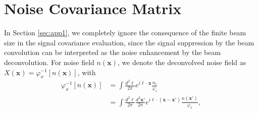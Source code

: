 \documentclass[aps, prd, reprint, nofootinbib, groupedaddress, showpacs]{revtex4-1}
\def\be{\begin{equation}}
\def\ee{\end{equation}}
\newcommand*\Bell{\ensuremath{\boldsymbol\ell}}
\begin{document}
\section{Noise Covariance Matrix}
\label{sec:app2}

In Section \ref{sec:app1}, we completely ignore the consequence of the finite beam size in
the signal covariance evaluation, since the signal suppression by the beam convolution
can be interpreted as the noise enhancement by the beam deconvolution.
For noise field $n(\mathbf x)$,  we denote the deconvolved noise field as
$X(\mathbf x) = \varphi^{-1}_x[ n(\mathbf x) ]$, with
\be
\begin{aligned}
    \varphi^{-1}_x[ n(\mathbf x) ]
    &= \int \frac{d^2\Bell}{2\pi} e^{i\Bell\cdot \mathbf x}  \frac{n_{\Bell}}{\varphi_{\Bell} }\\
    &=\int \frac{d^2\Bell}{2\pi} \frac{d^2\mathbf x'}{2\pi}
    e^{i\Bell\cdot (\mathbf x- \mathbf x')}  \frac{n(\mathbf x')}{\varphi_{\Bell} },
\end{aligned}
\ee
\end{document}
